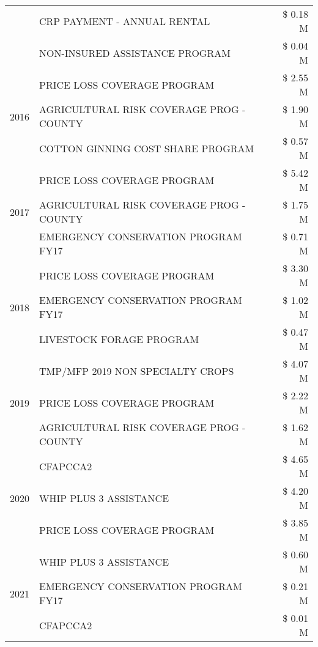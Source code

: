 \begin{tabular}{llr}
 & CRP PAYMENT - ANNUAL RENTAL & \$ 0.18 M \\
 & NON-INSURED ASSISTANCE PROGRAM & \$ 0.04 M \\
\cline{1-3}
\multirow[t]{3}{*}{2016} & PRICE LOSS COVERAGE PROGRAM & \$ 2.55 M \\
 & AGRICULTURAL RISK COVERAGE PROG - COUNTY & \$ 1.90 M \\
 & COTTON GINNING COST SHARE PROGRAM & \$ 0.57 M \\
\cline{1-3}
\multirow[t]{3}{*}{2017} & PRICE LOSS COVERAGE PROGRAM & \$ 5.42 M \\
 & AGRICULTURAL RISK COVERAGE PROG - COUNTY & \$ 1.75 M \\
 & EMERGENCY CONSERVATION PROGRAM FY17 & \$ 0.71 M \\
\cline{1-3}
\multirow[t]{3}{*}{2018} & PRICE LOSS COVERAGE PROGRAM & \$ 3.30 M \\
 & EMERGENCY CONSERVATION PROGRAM FY17 & \$ 1.02 M \\
 & LIVESTOCK FORAGE PROGRAM & \$ 0.47 M \\
\cline{1-3}
\multirow[t]{3}{*}{2019} & TMP/MFP 2019 NON SPECIALTY CROPS & \$ 4.07 M \\
 & PRICE LOSS COVERAGE PROGRAM & \$ 2.22 M \\
 & AGRICULTURAL RISK COVERAGE PROG - COUNTY & \$ 1.62 M \\
\cline{1-3}
\multirow[t]{3}{*}{2020} & CFAPCCA2 & \$ 4.65 M \\
 & WHIP PLUS 3 ASSISTANCE & \$ 4.20 M \\
 & PRICE LOSS COVERAGE PROGRAM & \$ 3.85 M \\
\cline{1-3}
\multirow[t]{3}{*}{2021} & WHIP PLUS 3 ASSISTANCE & \$ 0.60 M \\
 & EMERGENCY CONSERVATION PROGRAM FY17 & \$ 0.21 M \\
 & CFAPCCA2 & \$ 0.01 M \\
\cline{1-3}
\bottomrule
\end{tabular}
